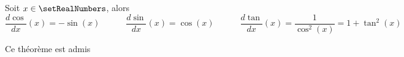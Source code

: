 \begin{theorem}
\label{trigonometrie:derivation}
Soit $x \in \setRealNumbers$, alors
\[
\dfrac{d\cos}{dx}(x) = -\sin(x)
\qquad\quad
\dfrac{d\sin}{dx}(x) = \cos(x)
\qquad\quad
\dfrac{d\tan}{dx}(x) = \dfrac{1}{\cos^2(x)} = 1 + \tan^2(x)
\]
\end{theorem}
Ce théorème est admis